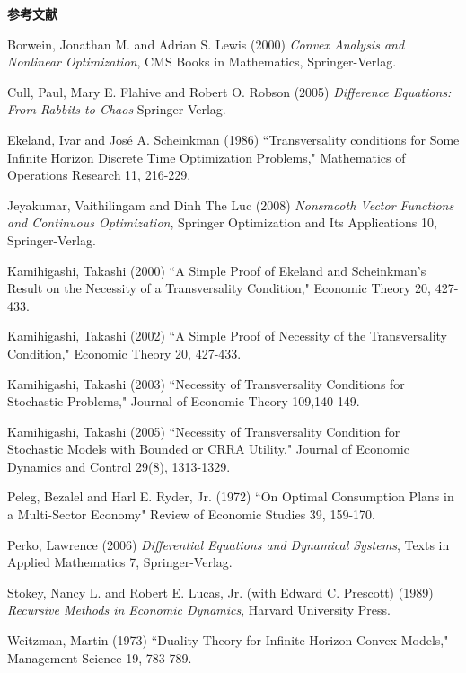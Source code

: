 \documentclass[a4paper,11pt]{jsarticle}
\begin{document}
\newpage

\begin{center}
	{\large \textbf{参考文献}}
\end{center}
\leftskip=22pt
\parindent=-22pt

Borwein, Jonathan M. and Adrian S. Lewis (2000) \textsl{Convex Analysis and Nonlinear Optimization}, CMS Books in Mathematics, Springer-Verlag.

Cull, Paul, Mary E. Flahive and Robert O. Robson (2005) \textsl{Difference Equations: From Rabbits to Chaos} Springer-Verlag.

Ekeland, Ivar and Jos\'{e} A. Scheinkman (1986) ``Transversality conditions for Some Infinite Horizon
Discrete Time  Optimization Problems," Mathematics of Operations Research 11, 216-229.

Jeyakumar, Vaithilingam and Dinh The Luc (2008) \textsl{Nonsmooth Vector Functions and Continuous Optimization}, Springer Optimization and Its Applications 10, Springer-Verlag.

Kamihigashi, Takashi (2000) ``A Simple Proof of Ekeland and Scheinkman's Result on the Necessity of a Transversality Condition," Economic Theory 20, 427-433.

Kamihigashi, Takashi (2002) ``A Simple Proof of Necessity of the Transversality Condition," Economic Theory 20, 427-433.

Kamihigashi, Takashi (2003) ``Necessity of Transversality Conditions for Stochastic 
Problems," Journal of Economic Theory 109,140-149.

Kamihigashi, Takashi (2005) ``Necessity of Transversality Condition for Stochastic Models with Bounded or CRRA Utility," Journal of Economic Dynamics and Control 29(8), 1313-1329.

Peleg, Bezalel and Harl E. Ryder, Jr. (1972) ``On Optimal Consumption Plans in a Multi-Sector Economy" Review of Economic Studies 39, 159-170.

Perko, Lawrence (2006) \textsl{Differential Equations and Dynamical Systems}, Texts in Applied Mathematics 7, Springer-Verlag. 

Stokey, Nancy L. and Robert E. Lucas, Jr. (with Edward C. Prescott) (1989) \textsl{Recursive Methods in Economic Dynamics}, Harvard University Press.

Weitzman, Martin (1973) ``Duality Theory for Infinite Horizon Convex Models," Management
Science 19, 783-789.
\end{document}
